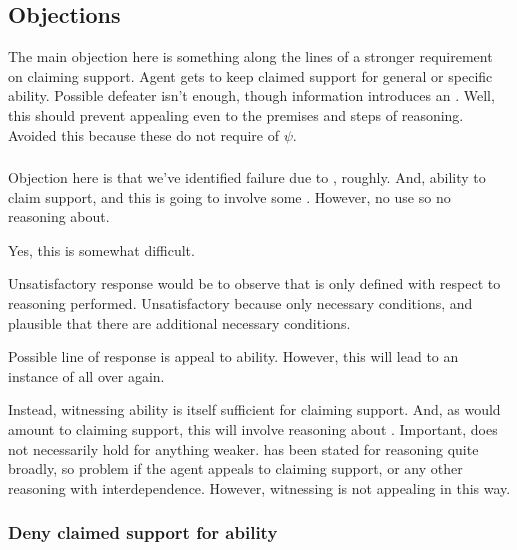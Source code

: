 \subsection{Objections}

\begin{note}
  The main objection here is something along the lines of a stronger requirement on claiming support.
  Agent gets to keep claimed support for general or specific ability.
  Possible defeater isn't enough, though information introduces an \requ{}.
  Well, this should prevent appealing even to the premises and steps of reasoning.
  Avoided this because these do not require \requ{} of \(\psi\).
\end{note}

\subsubsection{}
\label{sec:requ1}

\begin{note}
  Objection here is that we've identified failure due to , roughly.
  And, ability to claim support, and this is going to involve some .
  However, no use so no reasoning about.

  Yes, this is somewhat difficult.

  Unsatisfactory response would be to observe that \requ{} is only defined with respect to reasoning performed.
  Unsatisfactory because only necessary conditions, and plausible that there are additional necessary conditions.

  Possible line of response is appeal to ability.
  However, this will lead to an instance of \nI{} all over again.

  Instead, witnessing ability is itself sufficient for claiming support.
  And, as would amount to claiming support, this will involve reasoning about \requ{}.
  Important, \EAS{} does not necessarily hold for anything weaker.
  \nI{} has been stated for reasoning quite broadly, so problem if the agent appeals to claiming support, or any other reasoning with interdependence.
  However, witnessing is not appealing in this way.
\end{note}

\subsubsection{Deny claimed support for ability}

